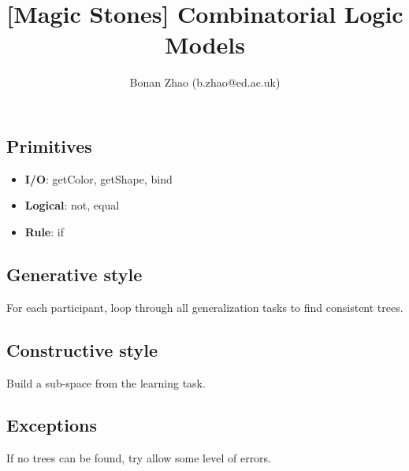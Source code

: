 \documentclass{article}
\title{[Magic Stones] Combinatorial Logic Models}
\author{Bonan Zhao (b.zhao@ed.ac.uk)}
\begin{document}
\maketitle

\subsection*{Primitives}

\begin{itemize}
	\item \textbf{I/O}: getColor, getShape, bind
	\item \textbf{Logical}: not, equal
	\item \textbf{Rule}: if
\end{itemize}

\subsection*{Generative style}

For each participant, loop through all generalization tasks to find consistent trees.

\subsection*{Constructive style}

Build a sub-space from the learning task.

\subsection*{Exceptions}

If no trees can be found, try allow some level of errors.
\end{document}
